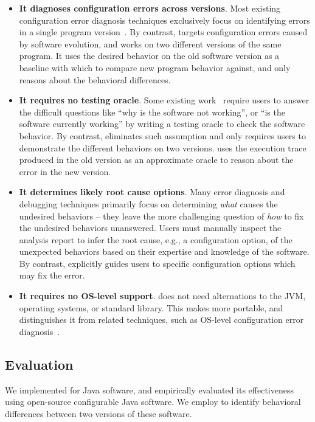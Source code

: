 \begin{itemize}
\item \textbf{It diagnoses configuration errors across versions}.
Most existing configuration error diagnosis techniques
exclusively focus on identifying errors in a single program
version~\cite{}. By contrast, \ourtool targets
configuration errors caused by software evolution, and
works on two different versions of the same program. 
It uses the desired behavior on the old software version
as a baseline with which to compare new program behavior against, and only
reasons about the behavioral differences.


\item \textbf{It requires no testing oracle}.
Some existing work~\cite{} require users to answer the difficult
questions like ``why is the software not working'', or
``is the software currently working'' by writing a testing
oracle to check the software behavior. By contrast,
\ourtool eliminates such assumption and only requires users to
demonstrate the different behaviors on two versions.
\ourtool uses the execution trace produced in the old
version as an approximate oracle to
reason about the error in the new version.

\item \textbf{It determines likely root cause options}.
Many error diagnosis and debugging techniques primarily focus on
determining \textit{what} causes the undesired behaviors
-- they leave the more challenging
question of \textit{how} to fix the undesired behaviors
unanswered. Users must manually inspect the analysis
report to infer
the root cause, e.g., a configuration option,
of the unexpected behaviors 
based on their expertise and knowledge of the software.
By contrast, \ourtool explicitly guides users to specific
configuration options which may fix the error.

\item \textbf{It requires no OS-level support}. \ourtool
does not need alternations to the JVM, operating systems, or
standard library. This makes \ourtool more portable, and
distinguishes it from related techniques, such as
OS-level configuration error diagnosis~\cite{}.

\end{itemize}

\subsection{Evaluation}

We implemented \ourtool for Java software, and empirically evaluated
its effectiveness using \subjnum open-source configurable Java
software. We employ \ourtool to identify behavioral differences between
two versions of these software.

